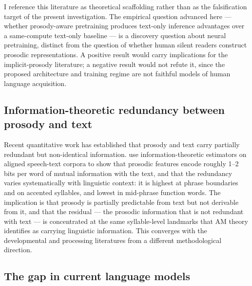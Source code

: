 \documentclass[11pt,letterpaper]{article}
\begin{document}
I reference this literature as theoretical scaffolding rather than as the falsification target of the present investigation. The empirical question advanced here --- whether prosody-aware pretraining produces text-only inference advantages over a same-compute text-only baseline --- is a discovery question about neural pretraining, distinct from the question of whether human silent readers construct prosodic representations. A positive result would carry implications for the implicit-prosody literature; a negative result would not refute it, since the proposed architecture and training regime are not faithful models of human language acquisition.

\subsection{Information-theoretic redundancy between prosody and text}

Recent quantitative work has established that prosody and text carry partially redundant but non-identical information. \citet{wolf2023, wolf2025} use information-theoretic estimators on aligned speech-text corpora to show that prosodic features encode roughly 1--2 bits per word of mutual information with the text, and that the redundancy varies systematically with linguistic context: it is highest at phrase boundaries and on accented syllables, and lowest in mid-phrase function words. The implication is that prosody is partially predictable from text but not derivable from it, and that the residual --- the prosodic information that is not redundant with text --- is concentrated at the same syllable-level landmarks that AM theory identifies as carrying linguistic information. This converges with the developmental and processing literatures from a different methodological direction.

\subsection{The gap in current language models}
\end{document}
